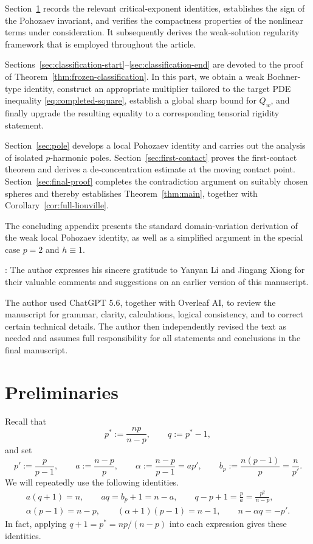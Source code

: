 \documentclass[reqno,12pt]{amsart}
\numberwithin{equation}{section}
\theoremstyle{remark}
\begin{document}
Section~\ref{sec:structure} records the relevant critical-exponent identities, establishes the sign of the Pohozaev invariant, and verifies the compactness properties of the nonlinear terms under consideration. It subsequently derives the weak-solution regularity framework that is employed throughout the article.  

Sections~\ref{sec:classification-start}--\ref{sec:classification-end} are devoted to the proof of Theorem~\ref{thm:frozen-classification}. In this part, we obtain a weak Bochner-type identity, construct an appropriate multiplier tailored to the target PDE inequality \eqref{eq:completed-square}, establish a global sharp bound for $Q_w$, and finally upgrade the resulting   equality to a corresponding tensorial rigidity statement.  

Section~\ref{sec:pole} develops a local Pohozaev identity and carries out the analysis of isolated $p$-harmonic poles. Section~\ref{sec:first-contact} proves the first-contact theorem and derives a de-concentration estimate at the moving contact point. Section~\ref{sec:final-proof} completes the contradiction argument on suitably chosen spheres and thereby establishes Theorem~\ref{thm:main}, together with Corollary~\ref{cor:full-liouville}.  

The concluding appendix presents the standard domain-variation derivation of the weak local Pohozaev identity, as well as a simplified argument in the special case $p=2$ and $h\equiv 1$.

\medskip
{}: The author expresses his sincere gratitude to Yanyan Li and Jingang Xiong for their valuable comments and suggestions on an earlier version of this manuscript.


The author used ChatGPT 5.6, together with Overleaf AI, to review the manuscript for grammar, clarity, calculations, logical consistency, and to correct certain technical details. The author then independently revised the text as needed and assumes full responsibility for all statements and conclusions in the final manuscript.


\section{Preliminaries}\label{sec:structure}

Recall that
$$
p^* := \frac{np}{n-p}, 
\qquad q := p^*-1,
$$
and set
\begin{equation*}
p':=\frac{p}{p-1}, \qquad a:=\frac{n-p}{p},
\qquad \alpha:=\frac{n-p}{p-1}=ap', 
\qquad b_p:=\frac{n(p-1)}p=\frac n{p'}.
\end{equation*}
We will repeatedly use the following identities.
\begin{equation}\label{eq:exponent-identities}
\begin{gathered}
a(q+1)=n,
\qquad aq=b_p+1=n-a,
\qquad q-p+1=\frac pa=\frac{p^2}{n-p},\\
\alpha(p-1)=n-p,
\qquad (\alpha+1)(p-1)=n-1,
\qquad n-\alpha q=-p'.
\end{gathered}
\end{equation}
In fact, applying $q+1=p^*=np/(n-p)$ into each expression gives these identities.
\end{document}
